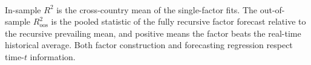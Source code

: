 \\[0.8ex]
{\scriptsize\begin{minipage}{0.92\linewidth}
  In-sample $R^{2}$ is the cross-country mean of the single-factor fits. The
  out-of-sample $R^{2}_{\mathrm{oos}}$ is the pooled
  \citet{campbellthompson2008} statistic of the fully recursive factor forecast
  relative to the recursive prevailing mean, and positive means the factor beats the
  real-time historical average. Both factor construction and forecasting
  regression respect time-$t$ information.
\end{minipage}}
